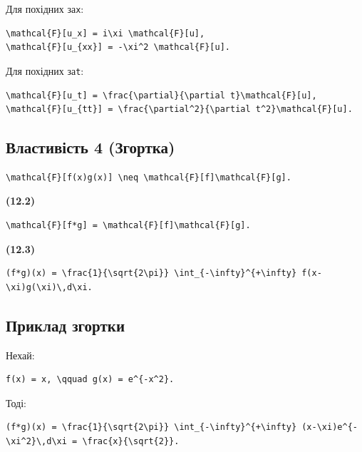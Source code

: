 \documentclass[
  ukrainian,
]{article}
\begin{document}
Для похідних за\texttt{x}:

\begin{verbatim}
\mathcal{F}[u_x] = i\xi \mathcal{F}[u],
\mathcal{F}[u_{xx}] = -\xi^2 \mathcal{F}[u].
\end{verbatim}

Для похідних за\texttt{t}:

\begin{verbatim}
\mathcal{F}[u_t] = \frac{\partial}{\partial t}\mathcal{F}[u],
\mathcal{F}[u_{tt}] = \frac{\partial^2}{\partial t^2}\mathcal{F}[u].
\end{verbatim}

\subsection{Властивість 4
(Згортка)}\label{ux432ux43bux430ux441ux442ux438ux432ux456ux441ux442ux44c-4-ux437ux433ux43eux440ux442ux43aux430}

\begin{verbatim}
\mathcal{F}[f(x)g(x)] \neq \mathcal{F}[f]\mathcal{F}[g].
\end{verbatim}

\textbf{(12.2)}

\begin{verbatim}
\mathcal{F}[f*g] = \mathcal{F}[f]\mathcal{F}[g].
\end{verbatim}

\textbf{(12.3)}

\begin{verbatim}
(f*g)(x) = \frac{1}{\sqrt{2\pi}} \int_{-\infty}^{+\infty} f(x-\xi)g(\xi)\,d\xi.
\end{verbatim}

\subsection{Приклад
згортки}\label{ux43fux440ux438ux43aux43bux430ux434-ux437ux433ux43eux440ux442ux43aux438}

Нехай:

\begin{verbatim}
f(x) = x, \qquad g(x) = e^{-x^2}.
\end{verbatim}

Тоді:

\begin{verbatim}
(f*g)(x) = \frac{1}{\sqrt{2\pi}} \int_{-\infty}^{+\infty} (x-\xi)e^{-\xi^2}\,d\xi = \frac{x}{\sqrt{2}}.
\end{verbatim}
\end{document}
